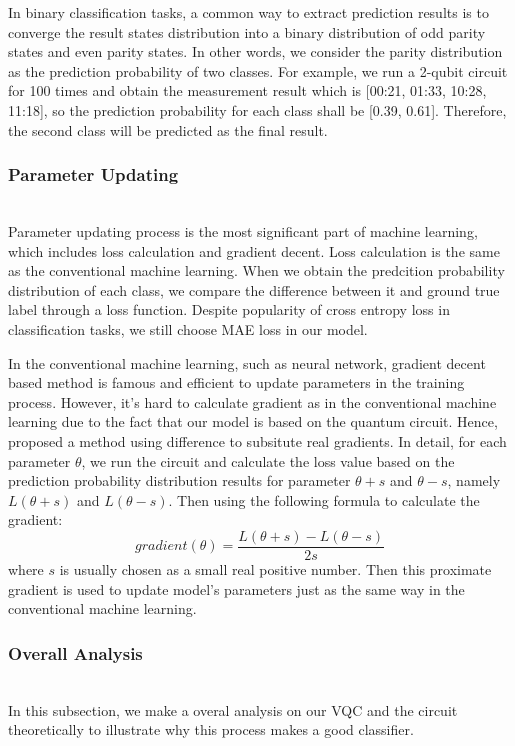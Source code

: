 \documentclass[sigconf]{acmart}
\begin{document}
 In binary classification tasks, a common way to extract prediction results is to converge the result states distribution into a binary distribution of odd parity states and even parity states. In other words, we consider the parity distribution as the prediction probability of two classes. For example, we run a 2-qubit circuit for 100 times and obtain the measurement result which is [00:21, 01:33, 10:28, 11:18], so the prediction probability for each class shall be [0.39, 0.61]. Therefore, the second class will be predicted as the final result.
\subsubsection{Parameter Updating}\hfill\\
Parameter updating process is the most significant part of machine learning, which includes loss calculation and gradient decent. Loss calculation is the same as the conventional machine learning. When we obtain the predcition probability distribution of each class, we compare the difference between it and ground true label through a loss function. Despite popularity of cross entropy loss in classification tasks, we still choose MAE loss in our model.

In the conventional machine learning, such as neural network, gradient decent based method is famous and efficient to update parameters in the training process. However, it's hard to calculate gradient as in the conventional machine learning due to the fact that our model is based on the quantum circuit. Hence, \cite{schuld2020circuit} proposed a method using difference to subsitute real gradients. In detail, for each parameter $\theta$, we run the circuit and calculate the loss value based on the prediction probability distribution results for parameter $\theta+s$ and $\theta-s$, namely $L(\theta+s)$ and $L(\theta-s)$. Then using the following formula to calculate the gradient:
$$gradient(\theta)=\frac{L(\theta+s)-L(\theta-s)}{2s}$$ 
where $s$ is usually chosen as a small real positive number. Then this proximate gradient is used to update model's parameters just as the same way in the conventional machine learning.

\subsubsection{Overall Analysis}\hfill\\
In this subsection, we make a overal analysis on our VQC and the circuit theoretically to illustrate why this process makes a good classifier.
\end{document}
